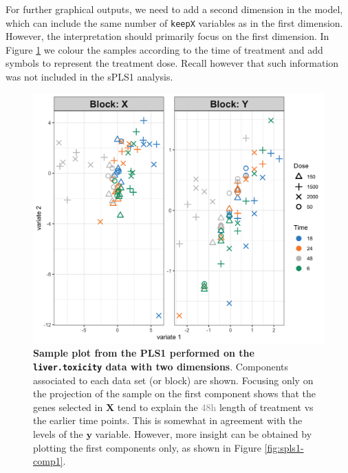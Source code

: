 \documentclass[]{book}
\newenvironment{Shaded}{\begin{snugshade}}{\end{snugshade}}
\newcommand{\KeywordTok}[1]{\textcolor[rgb]{0.13,0.29,0.53}{\textbf{#1}}}
\newcommand{\DataTypeTok}[1]{\textcolor[rgb]{0.13,0.29,0.53}{#1}}
\newcommand{\DecValTok}[1]{\textcolor[rgb]{0.00,0.00,0.81}{#1}}
\newcommand{\StringTok}[1]{\textcolor[rgb]{0.31,0.60,0.02}{#1}}
\newcommand{\OtherTok}[1]{\textcolor[rgb]{0.56,0.35,0.01}{#1}}
\newcommand{\OperatorTok}[1]{\textcolor[rgb]{0.81,0.36,0.00}{\textbf{#1}}}
\newcommand{\NormalTok}[1]{#1}
\begin{document}
For further graphical outputs, we need to add a second dimension in the
model, which can include the same number of \texttt{keepX} variables as
in the first dimension. However, the interpretation should primarily
focus on the first dimension. In Figure \ref{fig:spls1-ext} we colour
the samples according to the time of treatment and add symbols to
represent the treatment dose. Recall however that such information was
not included in the sPLS1 analysis.

\begin{Shaded}
\end{Shaded}

\begin{figure}

{\centering \includegraphics[width=0.5\linewidth]{Figures/PLS/spls1-ext-1} 

}

\caption{\textbf{Sample plot from the PLS1 performed on the
\texttt{liver.toxicity} data with two dimensions}. Components associated
to each data set (or block) are shown. Focusing only on the projection
of the sample on the first component shows that the genes selected in
\(\boldsymbol X\) tend to explain the \textcolor{grey}{48h} length of
treatment vs the earlier time points. This is somewhat in agreement with
the levels of the \(\boldsymbol y\) variable. However, more insight can
be obtained by plotting the first components only, as shown in Figure
\ref{fig:spls1-comp1}.}\label{fig:spls1-ext}
\end{figure}
\end{document}
